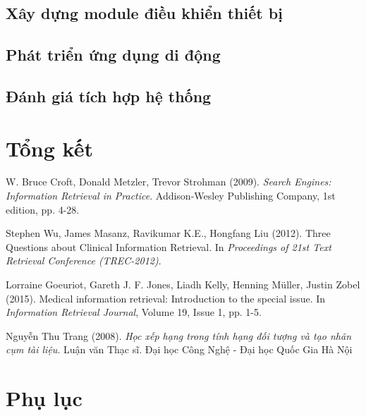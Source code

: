 \documentclass[11pt,a4paper,oneside]{book}
\begin{document}
\section{Xây dựng module điều khiển thiết bị}
\newpage
\section{Phát triển ứng dụng di động}
\newpage
\section{Đánh giá tích hợp hệ thống}

\chapter{Tổng kết} 

\newpage
\renewcommand{\refname}{Tài liệu tham khảo}
\begin{thebibliography}{80}

 W. Bruce Croft, Donald Metzler, Trevor Strohman (2009). \textit{Search Engines: Information Retrieval in Practice}. Addison-Wesley Publishing Company, 1st edition, pp. 4-28.

 Stephen Wu, James Masanz, Ravikumar K.E., Hongfang Liu (2012). Three Questions about Clinical Information Retrieval. In \textit{ Proceedings of 21st Text Retrieval Conference (TREC-2012)}.

 Lorraine Goeuriot, Gareth J. F. Jones, Liadh Kelly, Henning Müller, Justin Zobel (2015). Medical information retrieval: Introduction to the special issue. In \textit{Information Retrieval Journal}, Volume 19, Issue 1, pp. 1-5.

 Nguyễn Thu Trang (2008). \textit{Học xếp hạng trong tính hạng đối tượng và tạo nhãn cụm tài liệu}. Luận văn Thạc sĩ. Đại học Công Nghệ - Đại học Quốc Gia Hà Nội

\end{thebibliography}

\chapter*{Phụ lục} 
\end{document}

